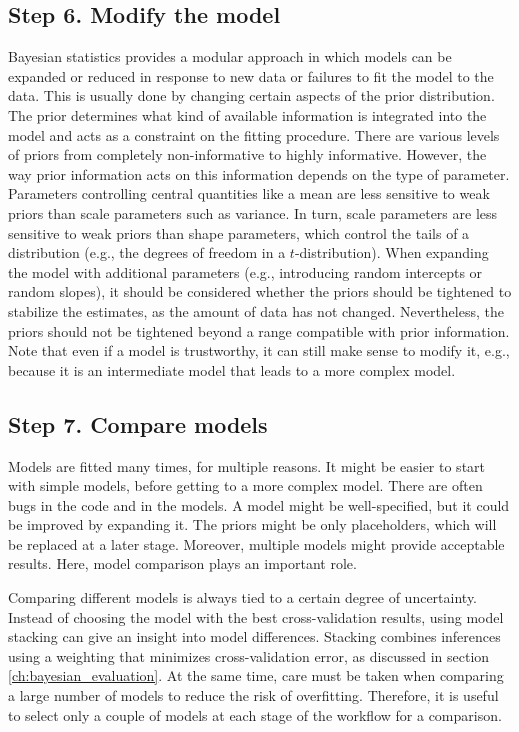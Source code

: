 \subsection{Step 6. Modify the model}

Bayesian statistics provides a modular approach in which models can be expanded or reduced in response to new data or failures to fit the model to the data.
This is usually done by changing certain aspects of the prior distribution.
The prior determines what kind of available information is integrated into the model and acts as a constraint on the fitting procedure.
There are various levels of priors from completely non-informative to highly informative.
However, the way prior information acts on this information depends on the type of parameter.
Parameters controlling central quantities like a mean are less sensitive to weak priors than scale parameters such as variance.
In turn, scale parameters are less sensitive to weak priors than shape parameters, which control the tails of a distribution (e.g., the degrees of freedom in a $t$-distribution).
When expanding the model with additional parameters (e.g., introducing random intercepts or random slopes), it should be considered whether the priors should be tightened to stabilize the estimates, as the amount of data has not changed.
Nevertheless, the priors should not be tightened beyond a range compatible with prior information.
Note that even if a model is trustworthy, it can still make sense to modify it, e.g., because it is an intermediate model that leads to a more complex model.

\subsection{Step 7. Compare models}

Models are fitted many times, for multiple reasons.
It might be easier to start with simple models, before getting to a more complex model. There are often bugs in the code and in the models.
A model might be well-specified, but it could be improved by expanding it.
The priors might be only placeholders, which will be replaced at a later stage.
Moreover, multiple models might provide acceptable results.
Here, model comparison plays an important role.

Comparing different models is always tied to a certain degree of uncertainty.
Instead of choosing the model with the best cross-validation results, using model stacking can give an insight into model differences.
Stacking combines inferences using a weighting that minimizes cross-validation error, as discussed in section \ref{ch:bayesian_evaluation}.
At the same time, care must be taken when comparing a large number of models to reduce the risk of overfitting.
Therefore, it is useful to select only a couple of models at each stage of the workflow for a comparison.
